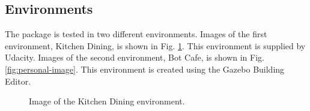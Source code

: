\documentclass[10pt,journal,compsoc]{IEEEtran}
\begin{document}
\subsection{Environments}
The package is tested in two different environments. Images of the first environment, Kitchen Dining, is shown in Fig. \ref{fig:supplied-image}. This environment is supplied by Udacity. Images of the second environment, Bot Cafe, is shown in Fig. \ref{fig:personal-image}. This environment is created using the Gazebo Building Editor.

\begin{figure}[thpb]
      \centering
      \vfill
      \caption{Image of the Kitchen Dining environment.}
      \label{fig:supplied-image}
\end{figure}
\end{document}
